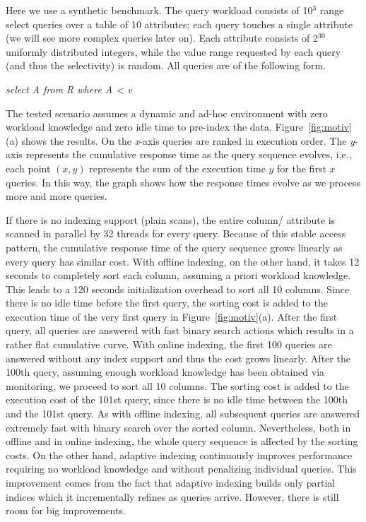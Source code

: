   
Here we use a synthetic benchmark.
The query workload consists of 10$^{3}$ range select queries over a table of  10 attributes;
each query touches a single attribute  (we will see more complex queries later on).
Each attribute consists of 2$^{30}$ uniformly distributed integers,
while the value range requested by each query (and thus the selectivity) is random. 
All queries are of the following form.

\vspace{0.5em}
\centerline{\emph{select A from R where A < v}}
\vspace{0.5em}

The tested scenario assumes a dynamic and ad-hoc environment 
with zero workload knowledge and zero idle time to pre-index the data. 
Figure~\ref{fig:motiv}(a)  shows the results.
On the \emph{x}-axis queries are ranked in execution order.
The \emph{y}-axis represents the cumulative response time as the query sequence evolves, 
i.e., each point $(x, y)$ represents the sum of the execution time $y$ for the first $x$ queries.
In this way, the graph shows how the response times evolve as we process more and more queries.

If there is no indexing support (plain scans), the entire column/ attribute is scanned in parallel by 32 threads for every query.
Because of this stable access pattern, the cumulative response time of the query sequence grows linearly
as every query has similar cost.
With offline indexing, on the other hand, it takes 12 seconds to completely sort each column, assuming a priori workload knowledge.
This leads to a 120 seconds initialization overhead to sort all 10 columns.
Since there is no idle time before the first query, the sorting cost is added to the execution time of the very first query in Figure~\ref{fig:motiv}(a).
After the first query, all queries are answered with fast binary search actions which results in a rather flat cumulative curve.
With online indexing, the first 100 queries are answered without any index support and thus the cost grows linearly.
After the 100th query,  assuming enough workload knowledge has been obtained via monitoring, we proceed to sort all 10 columns.
The sorting cost is added to the execution cost of the 101st query, since there is no idle time between the 100th and the 101st query.
As with offline indexing, all subsequent queries are answered extremely fast with binary search over the sorted column.
Nevertheless, both in offline and in online indexing, the whole query sequence is affected by the sorting costs.
On the other hand, adaptive indexing continuously improves performance requiring no workload knowledge 
and without penalizing individual queries. This improvement comes from the fact that adaptive indexing builds only partial indices
which it incrementally refines as queries arrive.
However, there is still room for big improvements.


